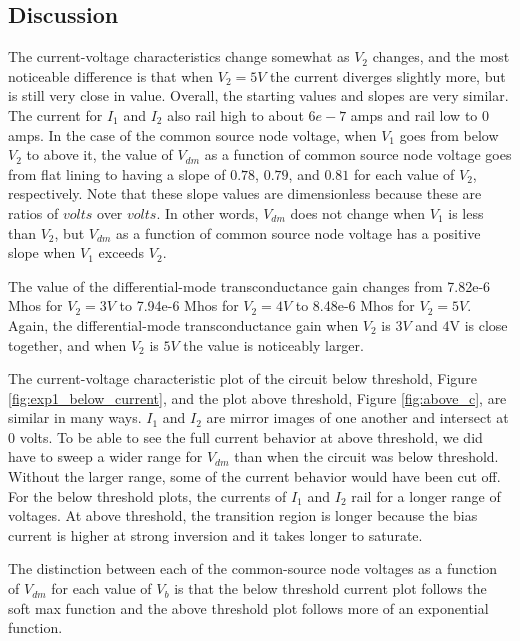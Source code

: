 \documentclass{article}
\begin{document}
\subsection{Discussion}
The current-voltage characteristics change somewhat as $V_2$ changes, and the most noticeable difference is that when $V_2=5V$ the current diverges slightly more, but is still very close in value. Overall, the starting values and slopes are very similar.  The current for $I_{1}$ and $I_{2}$ also rail high to about $6e-7$ amps and rail low to 0 amps.
 In the case of the common source node voltage, when $V_1$ goes from below $V_2$ to above it, the value of $V_{dm}$ as a function of common source node voltage goes from flat lining to having a slope of $0.78$, $0.79$, and $0.81$ for each value of $V_2$, respectively. Note that these slope values are dimensionless because these are ratios of $volts$ over $volts$. In other words, $V_{dm}$ does not change when $V_1$ is less than $V_2$, but $V_{dm}$ as a function of common source node voltage has a positive slope when $V_1$ exceeds $V_2$.
 
The value of the differential-mode transconductance gain changes from 7.82e-6 Mhos for $V_2=3V$ to 7.94e-6 Mhos for $V_2=4V$ to 8.48e-6 Mhos for $V_2=5V$. Again, the differential-mode transconductance gain when $V_2$ is $3V$ and $4$V is close together, and when $V_2$ is $5V$ the value is noticeably larger.

The current-voltage characteristic plot of the circuit below threshold, Figure \ref{fig:exp1_below_current}, and the plot above threshold, Figure \ref{fig:above_c}, are similar in many ways.  $I_{1}$ and $I_{2}$ are mirror images of one another and intersect at 0 volts.  To be able to see the full current behavior at above threshold, we did have to sweep a wider range for $V_{dm}$ than when the circuit was below threshold.  Without the larger range, some of the current behavior would have been cut off. For the below threshold plots, the currents of $I_{1}$ and $I_{2}$ rail for a longer range of voltages.  At above threshold, the transition region is longer because the bias current is higher at strong inversion and it takes longer to saturate.

The distinction between each of the common-source node voltages as a function of $V_{dm}$ for each value of $V_b$ is that the below threshold current plot follows the soft max function and the above threshold plot follows more of an exponential function.
\
\end{document}

